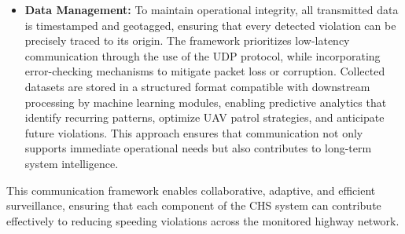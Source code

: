 \begin{itemize}
    \item \textbf{Data Management:}  
    To maintain operational integrity, all transmitted data is timestamped and geotagged, ensuring that every detected violation can be precisely traced to its origin. The framework prioritizes low-latency communication through the use of the UDP protocol, while incorporating error-checking mechanisms to mitigate packet loss or corruption. Collected datasets are stored in a structured format compatible with downstream processing by machine learning modules, enabling predictive analytics that identify recurring patterns, optimize UAV patrol strategies, and anticipate future violations. This approach ensures that communication not only supports immediate operational needs but also contributes to long-term system intelligence.
\end{itemize}

This communication framework enables collaborative, adaptive, and efficient surveillance, ensuring that each component of the CHS system can contribute effectively to reducing speeding violations across the monitored highway network.






